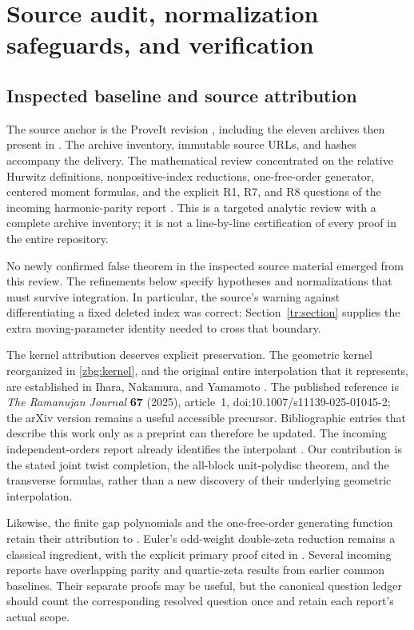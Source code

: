 \section{Source audit, normalization safeguards, and verification}
\label{audit:section}

\subsection{Inspected baseline and source attribution}

The source anchor is the ProveIt revision
, including the eleven
archives then present in  \cite{Repository}.
The archive inventory, immutable source URLs, and hashes accompany
the delivery.  The mathematical review concentrated on the relative
Hurwitz definitions, nonpositive-index reductions, one-free-order
generator, centered moment formulas, and the explicit R1, R7, and R8
questions of the incoming harmonic-parity report
\cite{IncomingParity,IncomingIndependent}.  This is a targeted analytic
review with a complete archive inventory; it is not a line-by-line
certification of every proof in the entire repository.

No newly confirmed false theorem in the inspected source material
emerged from this review.  The refinements below specify hypotheses and
normalizations that must survive integration.  In particular, the
source's warning against differentiating a fixed deleted index was
correct: Section~\ref{tr:section} supplies the extra moving-parameter
identity needed to cross that boundary.

The kernel attribution deserves explicit preservation.  The geometric
kernel reorganized in \eqref{zbg:kernel}, and the original entire
interpolation that it represents, are established in Ihara, Nakamura,
and Yamamoto \cite[Proposition~3.3 and Theorem~4.1]{INY}.  The published
reference is \emph{The Ramanujan Journal} \textbf{67} (2025), article~1,
doi:10.1007/s11139-025-01045-2; the arXiv version remains a useful
accessible precursor.  Bibliographic entries that describe this work
only as a preprint can therefore be updated.  The incoming
independent-orders report already identifies the interpolant
\cite{IncomingIndependent}.  Our contribution is the stated joint
twist completion, the all-block unit-polydisc theorem, and the
transverse formulas, rather than a new discovery of their underlying
geometric interpolation.

Likewise, the finite gap polynomials and the one-free-order generating
function retain their attribution to \cite{IncomingParity}.  Euler's
odd-weight double-zeta reduction remains a classical ingredient,
with the explicit primary proof cited in \cite{Bradley2007}.
Several incoming reports have overlapping parity and quartic-zeta
results from earlier common baselines.  Their separate proofs may be
useful, but the canonical question ledger should count the corresponding
resolved question once and retain each report's actual scope.

